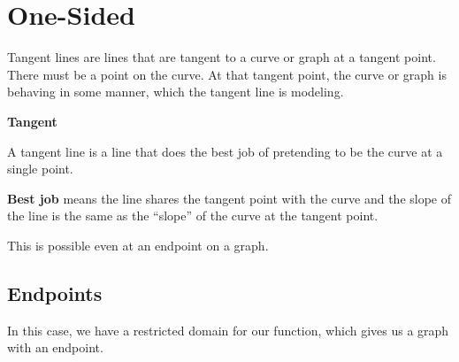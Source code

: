 \documentclass{ximera}
\begin{document}
\section*{One-Sided} 


 
 

Tangent lines are lines that are tangent to a curve or graph at a tangent point. There must be a point on the curve. At that tangent point, the curve or graph is behaving in some manner, which the tangent line is modeling.  

\begin{idea} \textbf{\textcolor{blue!55!black}{Tangent}}

A tangent line is a line that does the best job of pretending to be the curve at a single point.
\end{idea}
\textbf{Best job} means the line shares the tangent point with the curve and the slope of the line is the same as the ``slope'' of the curve at the tangent point. 





This is possible even at an endpoint on a graph.





\subsection*{Endpoints}



In this case, we have a restricted domain for our function, which gives us a graph with an endpoint. 




\begin{image}
\end{image}
\end{document}
